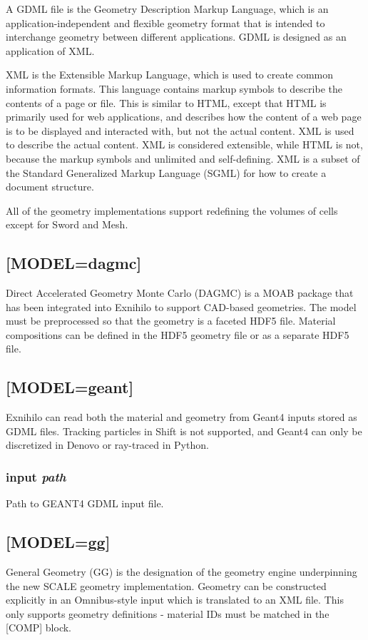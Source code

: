\documentclass[10pt]{article}
\begin{document}
A GDML file is the Geometry Description Markup Language, which is an application-independent and flexible geometry format that is intended to interchange geometry between different applications. GDML is designed as an application of XML.  

XML is the Extensible Markup Language, which is used to create common information formats. This language contains markup symbols to describe the contents of a page or file. This is similar to HTML, except that HTML is primarily used for web applications, and describes how the content of a web page is to be displayed and interacted with, but not the actual content. XML is used to describe the actual content. XML is considered extensible, while HTML is not, because the markup symbols and unlimited and self-defining. XML is a subset of the Standard Generalized Markup Language (SGML) for how to create a document structure. 

All of the geometry implementations support redefining the volumes of cells except for Sword and Mesh.

\subsection{[MODEL=dagmc]}
Direct Accelerated Geometry Monte Carlo (DAGMC) is a MOAB package that has been integrated into Exnihilo to support CAD-based geometries. The model must be preprocessed so that the geometry is a faceted HDF5 file. Material compositions can be defined in the HDF5 geometry file or as a separate HDF5 file.

\subsection{[MODEL=geant]}
Exnihilo can read both the material and geometry from Geant4 inputs stored as GDML files. Tracking particles in Shift is not supported, and Geant4 can only be discretized in Denovo or ray-traced in Python.

\subsubsection{input \textit{path}}
Path to GEANT4 GDML input file.

\subsection{[MODEL=gg]}
General Geometry (GG) is the designation of the geometry engine underpinning the new SCALE geometry implementation. Geometry can be constructed explicitly in an Omnibus-style input which is translated to an XML file. This only supports geometry definitions - material IDs must be matched in the [COMP] block. 
\end{document}
